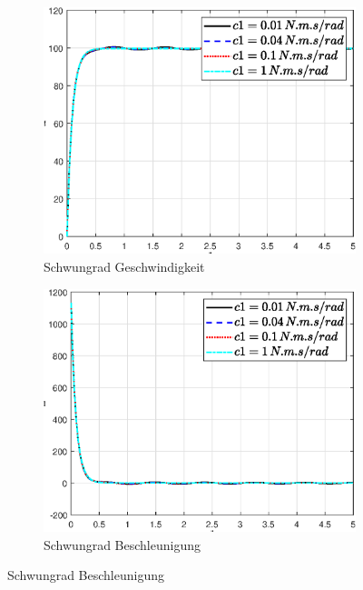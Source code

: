  \begin{figure}
    \captionsetup[subfigure]{justification=centering,font=footnotesize}
    \begin{subfigure}[b]{0.49\linewidth}
        \includegraphics[width=\linewidth]{Bilder/5_sensi/fig/c1/phi_punkt.eps}
        \caption{Schwungrad Geschwindigkeit}
        \label{fig:c1_phi_punkt}
    \end{subfigure}
    \begin{subfigure}[b]{0.49 \linewidth}
        \includegraphics[width=\linewidth]{Bilder/5_sensi/fig/c1/phi_punkt_punkt.eps}
        \caption{Schwungrad Beschleunigung}

\end{subfigure}
\end{figure}
